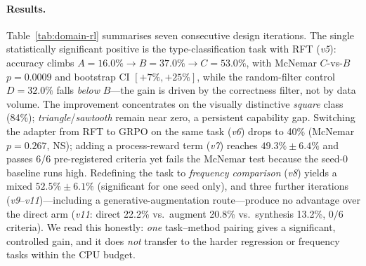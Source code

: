 \paragraph{Results.}
Table~\ref{tab:domain-rl} summarises seven consecutive design iterations. The single statistically significant positive is the type-classification task with RFT (\emph{v5}): accuracy climbs $A{=}16.0\%\to B{=}37.0\%\to C{=}53.0\%$, with McNemar $C$-vs-$B$ $p{=}0.0009$ and bootstrap CI $[+7\%,+25\%]$, while the random-filter control $D{=}32.0\%$ falls \emph{below} $B$---the gain is driven by the correctness filter, not by data volume. The improvement concentrates on the visually distinctive \emph{square} class (84\%); \emph{triangle}/\emph{sawtooth} remain near zero, a persistent capability gap. Switching the adapter from RFT to GRPO on the same task (\emph{v6}) drops to 40\% (McNemar $p{=}0.267$, NS); adding a process-reward term (\emph{v7}) reaches $49.3\%\pm6.4\%$ and passes 6/6 pre-registered criteria yet fails the McNemar test because the seed-0 baseline runs high. Redefining the task to \emph{frequency comparison} (\emph{v8}) yields a mixed $52.5\%\pm6.1\%$ (significant for one seed only), and three further iterations (\emph{v9}--\emph{v11})---including a generative-augmentation route---produce no advantage over the direct arm (\emph{v11}: direct 22.2\% vs.\ augment 20.8\% vs.\ synthesis 13.2\%, $0/6$ criteria). We read this honestly: \emph{one} task--method pairing gives a significant, controlled gain, and it does \emph{not} transfer to the harder regression or frequency tasks within the CPU budget.

